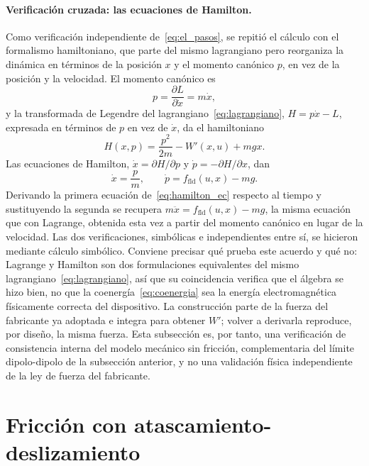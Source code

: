 \paragraph{Verificación cruzada: las ecuaciones de Hamilton.}
Como verificación independiente de~\eqref{eq:el_pasos}, se repitió el cálculo con el formalismo hamiltoniano, que parte del mismo lagrangiano pero reorganiza la dinámica en términos de la posición $x$ y el momento canónico $p$, en vez de la posición y la velocidad. El momento canónico es
\begin{equation}
p = \frac{\partial L}{\partial \dot{x}} = m\dot{x} ,
\label{eq:momento_canonico}
\end{equation}
y la transformada de Legendre del lagrangiano~\eqref{eq:lagrangiano}, $H=p\dot x - L$, expresada en términos de $p$ en vez de $\dot x$, da el hamiltoniano
\begin{equation}
H(x,p) = \frac{p^2}{2m} - W'(x,u) + mgx .
\label{eq:hamiltoniano}
\end{equation}
Las ecuaciones de Hamilton, $\dot{x}=\partial H/\partial p$ y $\dot{p}=-\partial H/\partial x$, dan
\begin{equation}
\dot{x} = \frac{p}{m} , \qquad \dot{p} = f_{\text{fld}}(u,x) - mg .
\label{eq:hamilton_ec}
\end{equation}
Derivando la primera ecuación de~\eqref{eq:hamilton_ec} respecto al tiempo y sustituyendo la segunda se recupera $m\ddot x = f_{\text{fld}}(u,x)-mg$, la misma ecuación que con Lagrange, obtenida esta vez a partir del momento canónico en lugar de la velocidad. Las dos verificaciones, simbólicas e independientes entre sí, se hicieron mediante cálculo simbólico. Conviene precisar qué prueba este acuerdo y qué no: Lagrange y Hamilton son dos formulaciones equivalentes del mismo lagrangiano~\eqref{eq:lagrangiano}, así que su coincidencia verifica que el álgebra se hizo bien, no que la coenergía~\eqref{eq:coenergia} sea la energía electromagnética físicamente correcta del dispositivo. La construcción parte de la fuerza del fabricante ya adoptada e integra para obtener $W'$; volver a derivarla reproduce, por diseño, la misma fuerza. Esta subsección es, por tanto, una verificación de consistencia interna del modelo mecánico sin fricción, complementaria del límite dipolo-dipolo de la subsección anterior, y no una validación física independiente de la ley de fuerza del fabricante.

\section{Fricción con atascamiento-deslizamiento}\label{sec:friccion_modelo}

